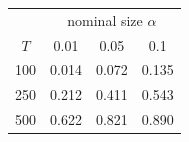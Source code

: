 % 
\begin{tabular}{cccc}
  \hline
  & \multicolumn{3}{c}{nominal size $\alpha$} \\
 $T$ & 0.01 & 0.05 & 0.1 \\
 \hline
100 & 0.014 & 0.072 & 0.135 \\ 
  250 & 0.212 & 0.411 & 0.543 \\ 
  500 & 0.622 & 0.821 & 0.890 \\ 
   \hline
\end{tabular}
